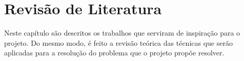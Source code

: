 \chapter{Revisão de Literatura}

Neste capítulo são descritos os trabalhos que serviram de inspiração para o projeto. 
Do mesmo modo, é feito a revisão teórica das técnicas que serão aplicadas para a resolução do problema que o projeto propõe resolver.















